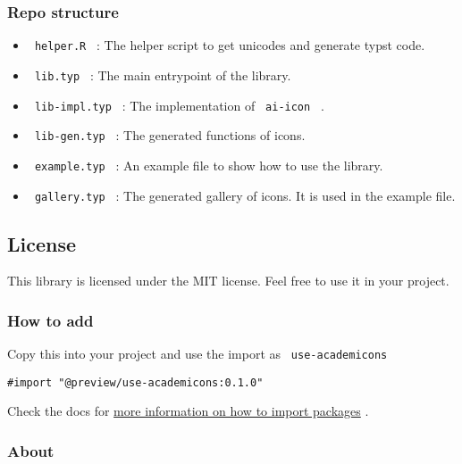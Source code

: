 \subsubsection{Repo structure}\label{repo-structure}

\begin{itemize}
\tightlist
\item
  \texttt{\ helper.R\ } : The helper script to get unicodes and generate
  typst code.
\item
  \texttt{\ lib.typ\ } : The main entrypoint of the library.
\item
  \texttt{\ lib-impl.typ\ } : The implementation of \texttt{\ ai-icon\ }
  .
\item
  \texttt{\ lib-gen.typ\ } : The generated functions of icons.
\item
  \texttt{\ example.typ\ } : An example file to show how to use the
  library.
\item
  \texttt{\ gallery.typ\ } : The generated gallery of icons. It is used
  in the example file.
\end{itemize}

\subsection{License}\label{license}

This library is licensed under the MIT license. Feel free to use it in
your project.

\subsubsection{How to add}\label{how-to-add}

Copy this into your project and use the import as
\texttt{\ use-academicons\ }

\begin{verbatim}
#import "@preview/use-academicons:0.1.0"
\end{verbatim}



Check the docs for
\href{https://typst.app/docs/reference/scripting/\#packages}{more
information on how to import packages} .

\subsubsection{About}\label{about}

